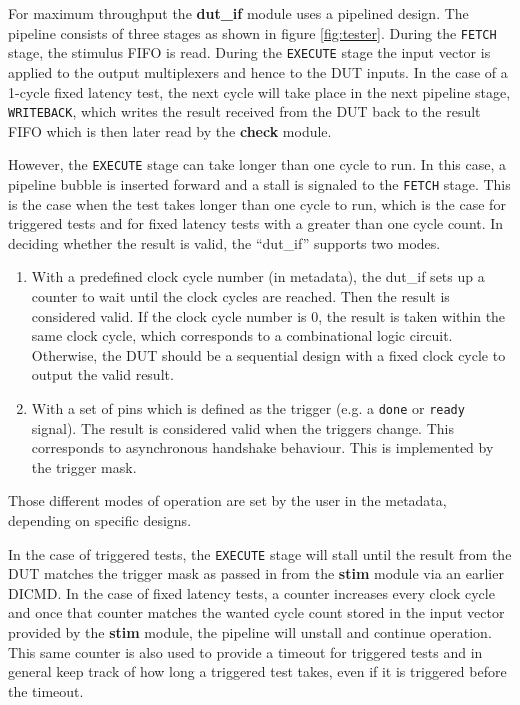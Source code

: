 For maximum throughput the \textbf{dut\_if} module uses a pipelined design. The pipeline consists of three stages
as shown in figure \ref{fig:tester}. During the \texttt{FETCH} stage, the stimulus FIFO is read. During the \texttt{EXECUTE}
stage the input vector is applied to the output multiplexers and hence to the DUT inputs. In the case of a 1-cycle
fixed latency test, the next cycle will take place in the next pipeline stage, \texttt{WRITEBACK}, which writes the result
received from the DUT back to the result FIFO which is then later read by the \textbf{check} module.

However, the \texttt{EXECUTE} stage can take longer than one cycle to run. In this case, a pipeline bubble is inserted forward
and a stall is signaled to the \texttt{FETCH} stage. This is the case when the test takes longer than one cycle to run, which
is the case for triggered tests and for fixed latency tests with a greater than one cycle count.
In deciding whether the result is valid, the ``dut\_if'' supports two modes.

\begin{enumerate}
 \item With a predefined clock cycle number (in metadata), the dut\_if sets up a counter to wait until the clock cycles are reached. Then the result is considered valid. If the clock cycle number is 0, the result is taken within the same clock cycle, which corresponds to a combinational logic circuit. Otherwise, the DUT should be a sequential design with a fixed clock cycle to output the valid result.

 \item With a set of pins which is defined as the trigger (e.g. a \texttt{done} or \texttt{ready} signal). The result is considered valid when the triggers change. This corresponds to asynchronous handshake behaviour. This is implemented by the trigger mask.
\end{enumerate}

Those different modes of operation are set by the user in the metadata, depending on specific designs.

In the case of triggered
tests, the \texttt{EXECUTE} stage will stall until the result from the DUT matches the trigger mask as passed in from the
\textbf{stim} module via an earlier DICMD. In the case of fixed latency tests, a counter increases every clock cycle and once
that counter matches the wanted cycle count stored in the input vector provided by the \textbf{stim} module, the pipeline
will unstall and continue operation. This same counter is also used to provide a timeout for triggered tests and in general
keep track of how long a triggered test takes, even if it is triggered before the timeout.


